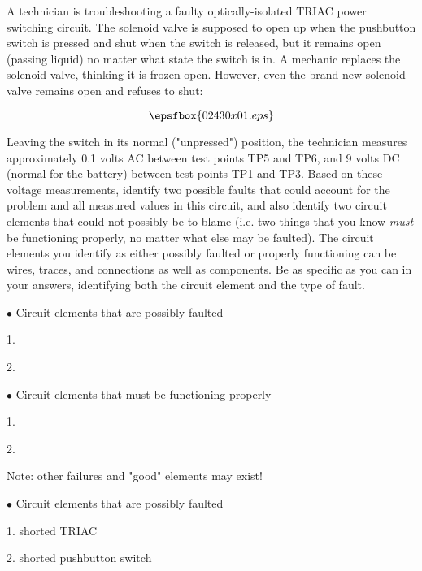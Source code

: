 

A technician is troubleshooting a faulty optically-isolated TRIAC power switching circuit.  The solenoid valve is supposed to open up when the pushbutton switch is pressed and shut when the switch is released, but it remains open (passing liquid) no matter what state the switch is in.  A mechanic replaces the solenoid valve, thinking it is frozen open.  However, even the brand-new solenoid valve remains open and refuses to shut:

$$\epsfbox{02430x01.eps}$$

Leaving the switch in its normal ("unpressed") position, the technician measures approximately 0.1 volts AC between test points TP5 and TP6, and 9 volts DC (normal for the battery) between test points TP1 and TP3.  Based on these voltage measurements, identify two possible faults that could account for the problem and all measured values in this circuit, and also identify two circuit elements that could not possibly be to blame (i.e. two things that you know {\it must} be functioning properly, no matter what else may be faulted).  The circuit elements you identify as either possibly faulted or properly functioning can be wires, traces, and connections as well as components.  Be as specific as you can in your answers, identifying both the circuit element and the type of fault.

\medskip
\item{$\bullet$} Circuit elements that are possibly faulted
\item{1.}
\item{2.}
\medskip

\medskip
\item{$\bullet$} Circuit elements that must be functioning properly
\item{1.}
\item{2.} 
\medskip







Note: other failures and "good" elements may exist!

\medskip
\item{$\bullet$} Circuit elements that are possibly faulted
\item{1.} shorted TRIAC 
\item{2.} shorted pushbutton switch
\medskip

